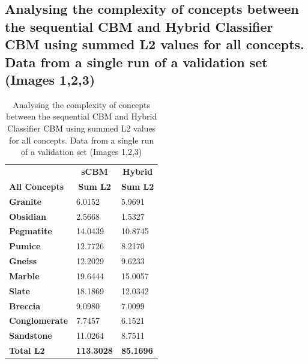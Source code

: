 \subsection{Analysing the complexity of concepts between the sequential CBM and Hybrid Classifier CBM using summed L2 values for all concepts.  Data from a single run of a validation set (Images 1,2,3)}

\begin{table}[H]
\centering
\begin{tabular}{@{}lll@{}}
                      & \multicolumn{1}{c}{\cellcolor[HTML]{DDEBF7}\textbf{sCBM}} & \multicolumn{1}{c}{\cellcolor[HTML]{E2EFDA}\textbf{Hybrid}} \\
\textbf{All Concepts} & \multicolumn{1}{c}{\textbf{Sum L2}}                       & \multicolumn{1}{c}{\textbf{Sum L2}}                         \\
\rowcolor[HTML]{F2F2F2} 
\textbf{Granite}      & 6.0152  & 5.9691  \\
\textbf{Obsidian}     & 2.5668  & 1.5327  \\
\rowcolor[HTML]{F2F2F2} 
\textbf{Pegmatite}    & 14.0439 & 10.8745 \\
\textbf{Pumice}       & 12.7726 & 8.2170  \\
\rowcolor[HTML]{F2F2F2} 
\textbf{Gneiss}       & 12.2029 & 9.6233  \\
\textbf{Marble}       & 19.6444 & 15.0057 \\
\rowcolor[HTML]{F2F2F2} 
\textbf{Slate}        & 18.1869 & 12.0342 \\
\textbf{Breccia}      & 9.0980  & 7.0099  \\
\rowcolor[HTML]{F2F2F2} 
\textbf{Conglomerate} & 7.7457  & 6.1521  \\
\textbf{Sandstone}    & 11.0264 & 8.7511  \\
\rowcolor[HTML]{FFF2CC} 
\textbf{Total L2}     & \textbf{113.3028}                                         & \textbf{85.1696}                                           
\end{tabular}
\\
\caption{Analysing the complexity of concepts between the sequential CBM and Hybrid Classifier CBM using summed L2 values for all concepts.  Data from a single run of a validation set (Images 1,2,3)}
\label{Analysing the complexity of concepts between the sequential CBM and Hybrid Classifier CBM using summed L2 values for all concepts  Data from a single run of a validation set Images 123}
\end{table}